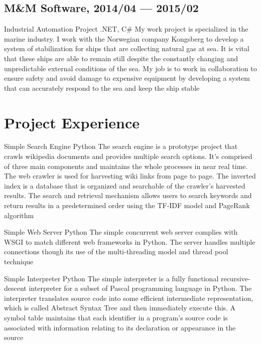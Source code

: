 \documentclass[11pt,a4paper]{moderncv}
\begin{document}
\subsection{M\&M Software, 2014/04 --- 2015/02}
\renewcommand{\baselinestretch}{1.0}
\cventry{}
{Industrial Automation Project}
{.NET, C\#}
{}{}
{
My work project is specialized in the marine industry. I work with the Norwegian company Kongsberg to develop a system of stabilization for ships that are collecting natural gas at sea. It is vital that these ships are able to remain still despite the constantly changing and unpredictable external conditions of the sea. My job is to work in collaboration to ensure safety and avoid damage to expensive equipment by developing a system that can accurately respond to the sea and keep the ship stable
}


\section{Project Experience}
\cventry{}
{Simple Search Engine}
{Python}
{}{}
{
The search engine is a prototype project that crawls wikipedia documents and provides multiple search options. It's comprised of three main components and maintains the whole processes in near real time. The web crawler is used for harvesting wiki links from page to page. The inverted index is a database that is organized and searchable of the crawler's harvested results. The search and retrieval mechanism allows users to search keywords and return results in a predetermined order using the TF-IDF model and PageRank algorithm
}

\vspace*{0.2\baselineskip}
\cventry{}
{Simple Web Server}
{Python}
{}{}
{
The simple concurrent web server complies with WSGI to match different web frameworks in Python. The server handles multiple connections though its use of the multi-threading model and thread pool technique
}

\vspace*{0.2\baselineskip}
\cventry{}
{Simple Interpreter}
{Python}
{}{}
{
The simple interpreter is a fully functional recursive-descent interpreter for a subset of Pascal programming language in Python. The interpreter translates source code into some efficient intermediate representation, which is called Abstract Syntax Tree and then immediately execute this. A symbol table maintains that each identifier in a program's source code is associated with information relating to its declaration or appearance in the source
}
\end{document}
